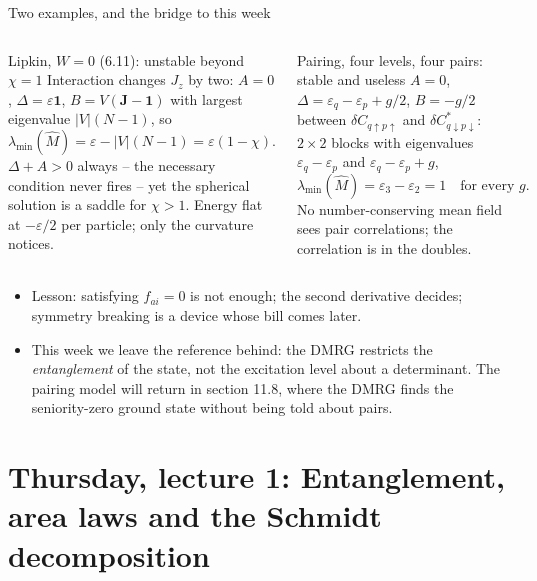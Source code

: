 \documentclass[aspectratio=169,10pt]{beamer}
\begin{document}
\begin{frame}{Two examples, and the bridge to this week}
  \footnotesize
  \begin{columns}[T]
    \begin{block}{Lipkin, $W=0$ (6.11): unstable beyond $\chi=1$}
      Interaction changes $J_z$ by two: $A=0$, $\Delta=\varepsilon\bm 1$, $B=V(\bm J-\bm 1)$ with largest eigenvalue $|V|(N-1)$, so
      \[
        \lambda_{\min}(\hat M)=\varepsilon-|V|(N-1)=\varepsilon(1-\chi).
      \]
      $\Delta+A>0$ always -- the necessary condition never fires -- yet the spherical solution is a saddle for $\chi>1$. Energy flat at $-\varepsilon/2$ per particle; only the curvature notices.
    \end{block}
    \begin{block}{Pairing, four levels, four pairs: stable and useless}
      $A=0$, $\Delta=\varepsilon_q-\varepsilon_p+g/2$, $B=-g/2$ between $\delta C_{q\uparrow p\uparrow}$ and $\delta C^{*}_{q\downarrow p\downarrow}$: $2\times2$ blocks with eigenvalues $\varepsilon_q-\varepsilon_p$ and $\varepsilon_q-\varepsilon_p+g$,
      \[
        \lambda_{\min}(\hat M)=\varepsilon_3-\varepsilon_2=1\quad\text{for every }g .
      \]
      No number-conserving mean field sees pair correlations; the correlation is in the doubles.
    \end{block}
  \end{columns}
  \vspace{0.4em}
  \begin{itemize}
    \item Lesson: satisfying $f_{ai}=0$ is not enough; the second derivative decides; symmetry breaking is a device whose bill comes later.
    \item \alert{This week} we leave the reference behind: the DMRG restricts the \emph{entanglement} of the state, not the excitation level about a determinant. The pairing model will return in section 11.8, where the DMRG finds the seniority-zero ground state without being told about pairs.
  \end{itemize}
\end{frame}


\section{Thursday, lecture 1: Entanglement, area laws and the Schmidt decomposition}
\end{document}
